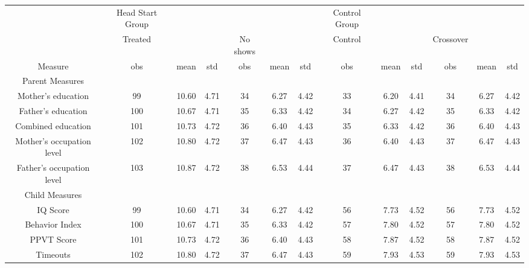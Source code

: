 \begin{table}[h]
\begin{center} \small
\begin{tabular}{ccccccccccccc}
\hline 

 & Head Start Group &  &  &  &  &  & Control Group &  &  &  &  &  \\

 & Treated &  &  & No shows &  &  & Control &  &  & Crossover &  &  \\

Measure & obs & mean & std & obs & mean & std & obs & mean & std & obs & mean & std \\

Parent Measures &  &  &  &  &  &  &  &  &  &  &  &  \\

Mother's education & 99 & 10.60 & 4.71 & 34 & 6.27 & 4.42 & 33 & 6.20 & 4.41 & 34 & 6.27 & 4.42 \\

Father's education & 100 & 10.67 & 4.71 & 35 & 6.33 & 4.42 & 34 & 6.27 & 4.42 & 35 & 6.33 & 4.42 \\

Combined education & 101 & 10.73 & 4.72 & 36 & 6.40 & 4.43 & 35 & 6.33 & 4.42 & 36 & 6.40 & 4.43 \\

Mother's occupation level & 102 & 10.80 & 4.72 & 37 & 6.47 & 4.43 & 36 & 6.40 & 4.43 & 37 & 6.47 & 4.43 \\

Father's occupation level & 103 & 10.87 & 4.72 & 38 & 6.53 & 4.44 & 37 & 6.47 & 4.43 & 38 & 6.53 & 4.44 \\

Child Measures &  &  &  &  &  &  &  &  &  &  &  &  \\

IQ Score & 99 & 10.60 & 4.71 & 34 & 6.27 & 4.42 & 56 & 7.73 & 4.52 & 56 & 7.73 & 4.52 \\

Behavior Index & 100 & 10.67 & 4.71 & 35 & 6.33 & 4.42 & 57 & 7.80 & 4.52 & 57 & 7.80 & 4.52 \\

PPVT Score & 101 & 10.73 & 4.72 & 36 & 6.40 & 4.43 & 58 & 7.87 & 4.52 & 58 & 7.87 & 4.52 \\

Timeouts & 102 & 10.80 & 4.72 & 37 & 6.47 & 4.43 & 59 & 7.93 & 4.53 & 59 & 7.93 & 4.53 \\

\hline 
\end{tabular}
\end{center}
\end{table}